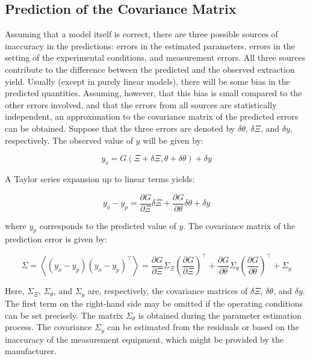 \documentclass[../Article_Design_of_Experiment.tex]{subfiles}
\begin{document}
	\subsection{Prediction of the Covariance Matrix}
	
	Assuming that a model itself is correct, there are three possible sources of inaccuracy in the predictions: errors in the estimated parameters, errors in the setting of the experimental conditions, and measurement errors. All three sources contribute to the difference between the predicted and the observed extraction yield. Usually (except in purely linear models), there will be some bias in the predicted quantities. Assuming, however, that this bias is small compared to the other errors involved, and that the errors from all sources are statistically independent, an approximation to the covariance matrix of the predicted errors can be obtained. Suppose that the three errors are denoted by $\delta \theta$, $\delta \Xi$, and $\delta y$, respectively. The observed value of $y$ will be given by:
	
	{\footnotesize \begin{equation} y_o = G(\Xi + \delta \Xi, \theta + \delta \theta) + \delta y \end{equation} }
	
	A Taylor series expansion up to linear terms yields:
	
	{\footnotesize \begin{equation} y_o - y_p = \frac{\partial G}{\partial \Xi} \delta \Xi + \frac{\partial G}{\partial \theta} \delta \theta + \delta y \end{equation} }
	
	where $y_p$ corresponds to the predicted value of $y$. The covariance matrix of the prediction error is given by:
	
	{\footnotesize \begin{equation} \Sigma = \left\langle (y_o - y_p)(y_o - y_p)^\top \right\rangle = \frac{\partial G}{\partial \Xi} \Sigma_\Xi \left( \frac{\partial G}{\partial \Xi} \right)^\top + \frac{\partial G}{\partial \theta} \Sigma_\theta \left( \frac{\partial G}{\partial \theta} \right)^\top + \Sigma_y \end{equation} }
	
	Here, $\Sigma_\Xi$, $\Sigma_\theta$, and $\Sigma_y$ are, respectively, the covariance matrices of $\delta \Xi$, $\delta \theta$, and $\delta y$. The first term on the right-hand side may be omitted if the operating conditions can be set precisely. The matrix $\Sigma_\theta$ is obtained during the parameter estimation process. The covariance $\Sigma_y$ can be estimated from the residuals or based on the inaccuracy of the measurement equipment, which might be provided by the manufacturer.
		
\end{document}

